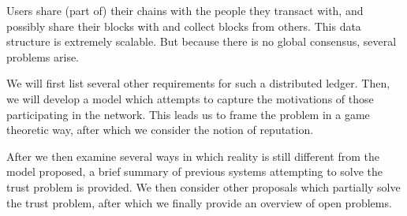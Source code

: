 Users share (part of) their chains with the people they transact with, and possibly share their blocks with and collect blocks from others. This data structure is extremely scalable. But because there is no global consensus, several problems arise.

We will first list several other requirements for such a distributed ledger. Then, we will develop a model which attempts to capture the motivations of those participating in the network. This leads us to frame the problem in a game theoretic way, after which we consider the notion of reputation.

After we then examine several ways in which reality is still different from the model proposed, a brief summary of previous systems attempting to solve the trust problem is provided. We then consider other proposals which partially solve the trust problem, after which we finally provide an overview of open problems.
